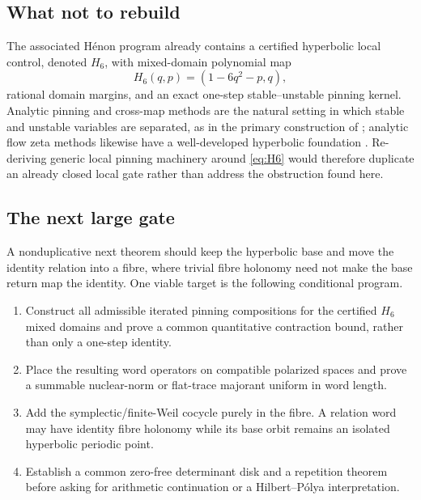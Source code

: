 \subsection{What not to rebuild}

The associated H\'enon program already contains a certified hyperbolic local
control, denoted $H_6$, with mixed-domain polynomial map
\begin{equation}
 H_6(q,p)=(1-6q^2-p,q),
 \label{eq:H6}
\end{equation}
rational domain margins, and an exact one-step stable--unstable pinning
kernel.  Analytic pinning and cross-map methods are the natural setting in
which stable and unstable variables are separated, as in the primary
construction of \citet{BaladiPujalsSambarino2005}; analytic flow zeta methods
likewise have a well-developed hyperbolic foundation \citep{Fried1995}.
Re-deriving generic local pinning machinery around \eqref{eq:H6} would
therefore duplicate an already closed local gate rather than address the
obstruction found here.

\subsection{The next large gate}

A nonduplicative next theorem should keep the hyperbolic base and move the
identity relation into a fibre, where trivial fibre holonomy need not make the
base return map the identity.  One viable target is the following conditional
program.

\begin{enumerate}[label=(P\arabic*),leftmargin=2.8em]
\item Construct all admissible iterated pinning compositions for the certified
  $H_6$ mixed domains and prove a common quantitative contraction bound,
  rather than only a one-step identity.
\item Place the resulting word operators on compatible polarized spaces and
  prove a summable nuclear-norm or flat-trace majorant uniform in word length.
\item Add the symplectic/finite-Weil cocycle purely in the fibre.  A relation
  word may have identity fibre holonomy while its base orbit remains an
  isolated hyperbolic periodic point.
\item Establish a common zero-free determinant disk and a repetition theorem
  before asking for arithmetic continuation or a Hilbert--P\'olya
  interpretation.
\end{enumerate}

